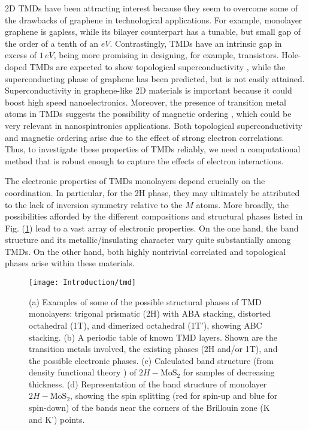 \ac{2D} \acp{TMD} have been attracting interest because they seem to overcome some of the drawbacks of graphene in technological applications.
For example, monolayer graphene is gapless, while its bilayer counterpart has a tunable, but small gap of the order of a tenth of an $eV$.
Contrastingly, \acp{TMD} have an intrinsic gap in excess of $1 \, eV$, being more promising in designing, for example, transistors.
Hole-doped \acp{TMD} are expected to show topological superconductivity \cite{hsu_topological_2017}, while the superconducting phase of graphene has been predicted, but is not easily attained.
Superconductivity in graphene-like \ac{2D} materials is important because it could boost high speed nanoelectronics.
Moreover, the presence of transition metal atoms in \acp{TMD} suggests the possibility of magnetic ordering \cite{braz_valley_2017}, which could be very relevant in nanospintronics applications.
Both topological superconductivity and magnetic ordering arise due to the effect of strong electron correlations.
Thus, to investigate these properties of \acp{TMD} reliably, we need a computational method that is robust enough to capture the effects of electron interactions.

The electronic properties of \acp{TMD} monolayers depend crucially on the coordination.
In particular, for the 2H phase, they may ultimately be attributed to the lack of inversion symmetry relative to the $M$ atoms.
More broadly, the possibilities afforded by the different compositions and structural phases listed in Fig. (\ref{fig:tmdProp}) lead to a vast array of electronic properties.
On the one hand, the band structure and its metallic/insulating character vary quite substantially among \acp{TMD}.
On the other hand, both highly nontrivial  correlated and topological phases arise within these materials.

\begin{figure}[H]
\vspace{-1cm}
\centering
\texttt{[image: Introduction/tmd]}
\vspace{-1.5cm}
 \caption[Structure and electronic properties of \ac{TMD} monolayers.]{(a) Examples of some of the possible structural phases of \ac{TMD} monolayers: trigonal prismatic (2H) with ABA stacking, distorted octahedral (1T), and dimerized octahedral (1T'), showing ABC stacking. (b) A periodic table of known \ac{TMD} layers. Shown are the transition metals involved, the existing phases (2H and/or 1T), and the possible electronic phases. (c) Calculated band structure (from density functional theory \cite{splendiani_emerging_2010} ) of $2H-\text{Mo}\text{S}_2$ for samples of decreasing thickness. (d) Representation of the band structure of monolayer $2H-\text{Mo}\text{S}_2$, showing the spin splitting (red for spin-up and blue for spin-down) of the bands near the corners of the Brillouin zone (K and K') points. \label{fig:tmdProp}}
\end{figure}

